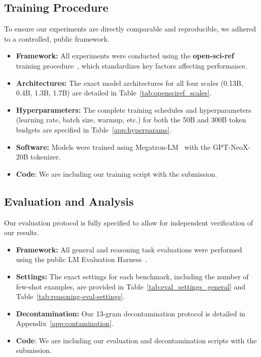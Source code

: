 \subsection{Training Procedure}

To ensure our experiments are directly comparable and reproducible, we adhered to a controlled, public framework.
\begin{itemize}
    \item \textbf{Framework:} All experiments were conducted using the \textbf{open-sci-ref} training procedure~\citep{nezhurina2025opensciref001openreproduciblereference}, which standardizes key factors affecting performance.
    \item \textbf{Architectures:} The exact model architectures for all four scales (0.13B, 0.4B, 1.3B, 1.7B) are detailed in Table~\ref{tab:opensciref_scales}.
    \item \textbf{Hyperparameters:} The complete training schedules and hyperparameters (learning rate, batch size, warmup, etc.) for both the 50B and 300B token budgets are specified in Table~\ref{app:hyperparams}.
    \item \textbf{Software:} Models were trained using Megatron-LM~\citep{shoeybi2020megatronlmtrainingmultibillionparameter} with the GPT-NeoX-20B tokenizer\citep{black2022gptneox}.
    \item \textbf{Code}: We are including our training script with the submission.
\end{itemize}

\subsection{Evaluation and Analysis}

Our evaluation protocol is fully specified to allow for independent verification of our results.
\begin{itemize}
    \item \textbf{Framework:} All general and reasoning task evaluations were performed using the public LM Evaluation Harness~\citep{eval-harness}.
    \item \textbf{Settings:} The exact settings for each benchmark, including the number of few-shot examples, are provided in Table~\ref{tab:eval_settings_general} and Table~\ref{tab:reasoning-eval-settings}.
    \item \textbf{Decontamination:} Our 13-gram decontamination protocol is detailed in Appendix~\ref{app:contamination}.
    \item \textbf{Code}: We are including our evaluation and decontamination scripts with the submission.
\end{itemize}

